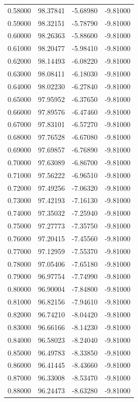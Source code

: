 \begin{table}
\begin{tabular}{llll}
0.58000 & 98.37841 & -5.68980 & -9.81000 \\
0.59000 & 98.32151 & -5.78790 & -9.81000 \\
0.60000 & 98.26363 & -5.88600 & -9.81000 \\
0.61000 & 98.20477 & -5.98410 & -9.81000 \\
0.62000 & 98.14493 & -6.08220 & -9.81000 \\
0.63000 & 98.08411 & -6.18030 & -9.81000 \\
0.64000 & 98.02230 & -6.27840 & -9.81000 \\
0.65000 & 97.95952 & -6.37650 & -9.81000 \\
0.66000 & 97.89576 & -6.47460 & -9.81000 \\
0.67000 & 97.83101 & -6.57270 & -9.81000 \\
0.68000 & 97.76528 & -6.67080 & -9.81000 \\
0.69000 & 97.69857 & -6.76890 & -9.81000 \\
0.70000 & 97.63089 & -6.86700 & -9.81000 \\
0.71000 & 97.56222 & -6.96510 & -9.81000 \\
0.72000 & 97.49256 & -7.06320 & -9.81000 \\
0.73000 & 97.42193 & -7.16130 & -9.81000 \\
0.74000 & 97.35032 & -7.25940 & -9.81000 \\
0.75000 & 97.27773 & -7.35750 & -9.81000 \\
0.76000 & 97.20415 & -7.45560 & -9.81000 \\
0.77000 & 97.12959 & -7.55370 & -9.81000 \\
0.78000 & 97.05406 & -7.65180 & -9.81000 \\
0.79000 & 96.97754 & -7.74990 & -9.81000 \\
0.80000 & 96.90004 & -7.84800 & -9.81000 \\
0.81000 & 96.82156 & -7.94610 & -9.81000 \\
0.82000 & 96.74210 & -8.04420 & -9.81000 \\
0.83000 & 96.66166 & -8.14230 & -9.81000 \\
0.84000 & 96.58023 & -8.24040 & -9.81000 \\
0.85000 & 96.49783 & -8.33850 & -9.81000 \\
0.86000 & 96.41445 & -8.43660 & -9.81000 \\
0.87000 & 96.33008 & -8.53470 & -9.81000 \\
0.88000 & 96.24473 & -8.63280 & -9.81000 \\

\end{tabular}
\end{table}
